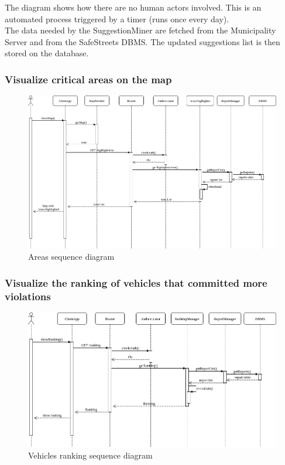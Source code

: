 \documentclass{article}
\begin{document}
The diagram shows how there are no human actors involved. This is an automated process triggered by a timer (runs once every day). \\
The data needed by the SuggestionMiner are fetched from the Municipality Server and from the SafeStreets DBMS. The updated suggestions list is then stored on the database.
\newpage
\subsubsection{Visualize critical areas on the map}
\begin{figure}[h!]
\centering
	\includegraphics[width=1.0\textwidth]{images/area-highlight-sequence.png}
	\caption{Areas sequence diagram}
	\label{fig:area-highlight-sequence}
\end{figure}

\newpage
\subsubsection{Visualize the ranking of vehicles that committed more violations}
\begin{figure}[h!]
\centering
	\includegraphics[width=1.0\textwidth]{images/ranking-sequence.png}
	\caption{Vehicles ranking sequence diagram}
	\label{fig:ranking-sequence}
\end{figure}
\end{document}
